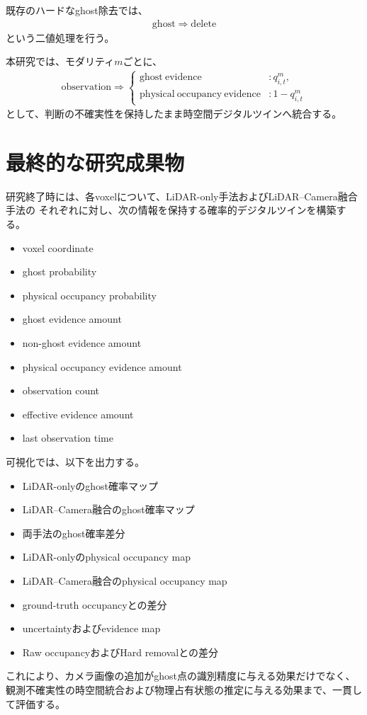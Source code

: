 \documentclass[uplatex,a4paper,11pt]{jsarticle}
\begin{document}
既存のハードなghost除去では、
\begin{align}
  \mathrm{ghost}
  \Rightarrow
  \mathrm{delete}
\end{align}
という二値処理を行う。

本研究では、モダリティ$m$ごとに、
\begin{align}
  \mathrm{observation}
  \Rightarrow
  \begin{cases}
    \mathrm{ghost\ evidence}
      &: q_{i,t}^{m},
    \\
    \mathrm{physical\ occupancy\ evidence}
      &: 1-q_{i,t}^{m}
  \end{cases}
\end{align}
として、判断の不確実性を保持したまま時空間デジタルツインへ統合する。

\section{最終的な研究成果物}

研究終了時には、各voxelについて、LiDAR-only手法およびLiDAR--Camera融合手法の
それぞれに対し、次の情報を保持する確率的デジタルツインを構築する。
\begin{itemize}
  \item voxel coordinate
  \item ghost probability
  \item physical occupancy probability
  \item ghost evidence amount
  \item non-ghost evidence amount
  \item physical occupancy evidence amount
  \item observation count
  \item effective evidence amount
  \item last observation time
\end{itemize}

可視化では、以下を出力する。
\begin{itemize}
  \item LiDAR-onlyのghost確率マップ
  \item LiDAR--Camera融合のghost確率マップ
  \item 両手法のghost確率差分
  \item LiDAR-onlyのphysical occupancy map
  \item LiDAR--Camera融合のphysical occupancy map
  \item ground-truth occupancyとの差分
  \item uncertaintyおよびevidence map
  \item Raw occupancyおよびHard removalとの差分
\end{itemize}

これにより、カメラ画像の追加がghost点の識別精度に与える効果だけでなく、
観測不確実性の時空間統合および物理占有状態の推定に与える効果まで、一貫して評価する。

\clearpage


\end{document}
